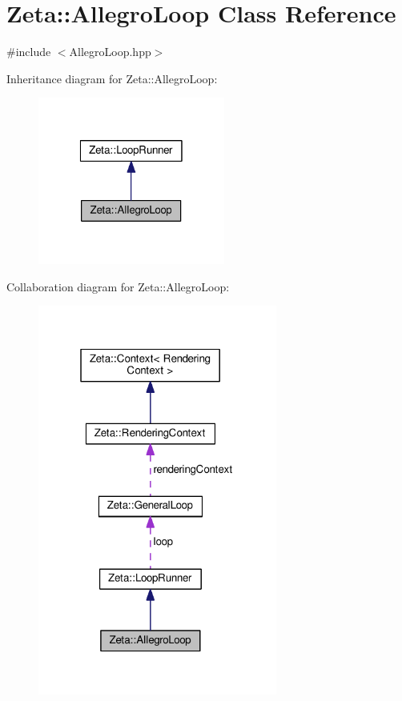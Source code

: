 \hypertarget{classZeta_1_1AllegroLoop}{\section{Zeta\+:\+:Allegro\+Loop Class Reference}
\label{classZeta_1_1AllegroLoop}
}


{\ttfamily \#include $<$Allegro\+Loop.\+hpp$>$}



Inheritance diagram for Zeta\+:\+:Allegro\+Loop\+:\nopagebreak
\begin{figure}[H]
\begin{center}
\leavevmode
\includegraphics[width=174pt]{classZeta_1_1AllegroLoop__inherit__graph}
\end{center}
\end{figure}


Collaboration diagram for Zeta\+:\+:Allegro\+Loop\+:\nopagebreak
\begin{figure}[H]
\begin{center}
\leavevmode
\includegraphics[width=223pt]{classZeta_1_1AllegroLoop__coll__graph}
\end{center}
\end{figure}
